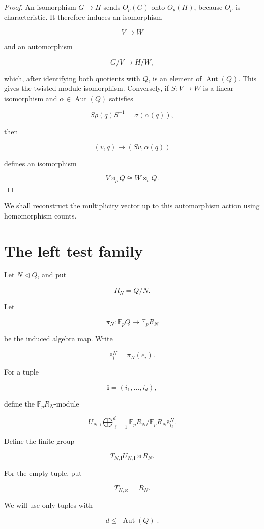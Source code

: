 \documentclass[11pt]{article}
\begin{document}
\begin{proof}
An isomorphism $G\to H$ sends $O_p(G)$ onto $O_p(H)$, because $O_p$ is characteristic. It therefore induces an isomorphism

\[
V\to W
\]

and an automorphism

\[
G/V\to H/W,
\]

which, after identifying both quotients with $Q$, is an element of $\operatorname{Aut}(Q)$. This gives the twisted module isomorphism. Conversely, if $S:V\to W$ is a linear isomorphism and $\alpha\in\operatorname{Aut}(Q)$ satisfies

\[
S\rho(q)S^{-1}=\sigma(\alpha(q)),
\]

then

\[
(v,q)\mapsto (Sv,\alpha(q))
\]

defines an isomorphism

\[
V\rtimes_\rho Q\cong W\rtimes_\sigma Q.
\]

\end{proof}

We shall reconstruct the multiplicity vector up to this automorphism action using homomorphism counts.

\section{The left test family}

Let $N\lhd Q$, and put

\[
R_N=Q/N.
\]

Let

\[
\pi_N:\mathbb F_pQ\to \mathbb F_pR_N
\]

be the induced algebra map. Write

\[
\bar e_i^N=\pi_N(e_i).
\]

For a tuple

\[
\mathbf i=(i_1,\ldots,i_d),
\]

define the $\mathbb F_pR_N$-module

\[
U_{N,\mathbf i}
\bigoplus_{\ell=1}^d
\mathbb F_pR_N/
\mathbb F_pR_N\bar e_{i_\ell}^N.
\]

Define the finite group

\[
T_{N,\mathbf i}
U_{N,\mathbf i}\rtimes R_N.
\]

For the empty tuple, put

\[
T_{N,\varnothing}=R_N.
\]

We will use only tuples with

\[
d\le |\operatorname{Aut}(Q)|.
\]
\end{document}
